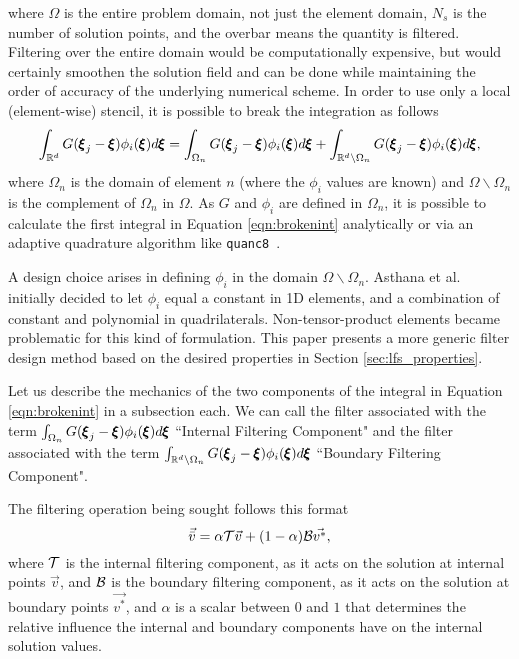 where $\Omega$ is the entire problem domain, not just the element domain, $N_s$ is the number of solution points, and the overbar means the quantity is filtered. Filtering over the entire domain would be computationally expensive, but would certainly smoothen the solution field and can be done while maintaining the order of accuracy of the underlying numerical scheme\cite{mirzaee2012efficient,steffen2008investigation,walfisch2009one}. In order to use only a local (element-wise) stencil, it is possible to break the integration as follows
\begin{equation}
\label{eqn:brokenint}
\int_{\mathbb{R}^d} G({\pmb \xi}_j - {\pmb \xi})  \phi_i({\pmb \xi})d{\pmb \xi} = \int_{\Omega_n} G({\pmb \xi}_j - {\pmb \xi})  \phi_i({\pmb \xi})d{\pmb \xi} + \int_{\mathbb{R}^d \backslash \Omega_n} G({\pmb \xi}_j - {\pmb \xi})  \phi_i({\pmb \xi})d{\pmb \xi},
\end{equation}
where $\Omega_n$ is the domain of element $n$ (where the $\phi_i$ values are known) and $\Omega \backslash \Omega_n$ is the complement of $\Omega_n$ in $\Omega$. As $G$ and $\phi_i$ are defined in $\Omega_n$, it is possible to calculate the first integral in Equation \eqref{eqn:brokenint} analytically or via an adaptive quadrature algorithm like \texttt{quanc8}~\cite{forsythe1977computer}.

A design choice arises in defining $\phi_i$ in the domain $\Omega \backslash \Omega_n$. Asthana et al.~\cite{asthana2014} initially decided to let $\phi_i$ equal a constant in 1D elements, and a combination of constant and polynomial in quadrilaterals. Non-tensor-product elements became problematic for this kind of formulation. This paper presents a more generic filter design method based on the desired properties in Section \ref{sec:lfs_properties}.

Let us describe the mechanics of the two components of the integral in Equation \eqref{eqn:brokenint} in a subsection each. We can call the filter associated with the term $\int_{\Omega_n} G({\pmb \xi}_j - {\pmb \xi})  \phi_i({\pmb \xi})d{\pmb \xi}$ ``Internal Filtering Component" and the filter associated with the term $\int_{\mathbb{R}^d \backslash \Omega_n} G({\pmb \xi}_j - {\pmb \xi})  \phi_i({\pmb \xi})d{\pmb \xi}$ ``Boundary Filtering Component".

The filtering operation being sought follows this format
\begin{equation}
\label{eqn:filter_form}
\vec{\bar{v}} = \alpha\mathcal{T}\vec{v} + (1-\alpha)\mathcal{B}\vec{v^*},
\end{equation}
where $\mathcal{T}$ is the internal filtering component, as it acts on the solution at internal points $\vec{v}$, and $\mathcal{B}$ is the boundary filtering component, as it acts on the solution at boundary points $\vec{v^*}$, and $\alpha$ is a scalar between $0$ and $1$ that determines the relative influence the internal and boundary components have on the internal solution values.

